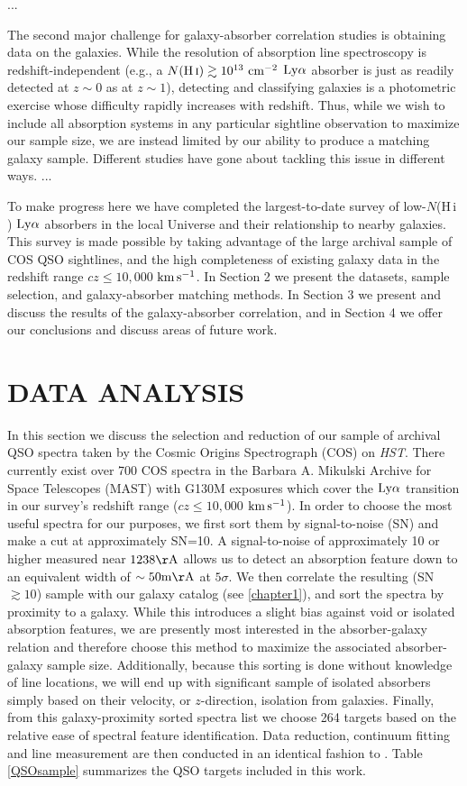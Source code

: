 \documentclass[twocolumn,tighten]{aastex62}
\newcommand{\kms}{$\rm km\, s^{-1}$}
\newcommand{\HI}{\mbox{H\,{\sc i}} }
\begin{document}
...


The second major challenge for galaxy-absorber correlation studies is obtaining data on the galaxies. While the resolution of absorption line spectroscopy is redshift-independent (e.g., a $N(\HI) \gtrsim 10^{13}  ~\rm cm^{-2}$ $\rm Ly\alpha$ absorber is just as readily detected at $z\sim0$ as at $z\sim 1$), detecting and classifying galaxies is a photometric exercise whose difficulty rapidly increases with redshift. Thus, while we wish to include all absorption systems in any particular sightline observation to maximize our sample size, we are instead limited by our ability to produce a matching galaxy sample. Different studies have gone about tackling this issue in different ways. ...


To make progress here we have completed the largest-to-date survey of low-$N$(\HI) $\rm Ly\alpha$ absorbers in the local Universe and their relationship to nearby galaxies. This survey is made possible by taking advantage of the large archival sample of COS QSO sightlines, and the high completeness of existing galaxy data in the redshift range $cz \leq 10,000$ \kms. In Section 2 we present the datasets, sample selection, and galaxy-absorber matching methods. In Section 3 we present and discuss the results of the galaxy-absorber correlation, and in Section 4 we offer our conclusions and discuss areas of future work.



\section{DATA ANALYSIS}
In this section we discuss the selection and reduction of our sample of archival QSO spectra taken by the Cosmic Origins Spectrograph (COS) on \textit{HST}. There currently exist over 700 COS spectra in the Barbara A. Mikulski Archive for Space Telescopes (MAST) with G130M exposures which cover the $\rm Ly\alpha$ transition in our survey's redshift range ($cz \leq 10,000$ \kms). In order to choose the most useful spectra for our purposes, we first sort them by signal-to-noise (SN) and make a cut at approximately SN=10. A signal-to-noise of approximately 10 or higher measured near $\rm 1238 \AA$ allows us to detect an absorption feature down to an equivalent width of $\rm \sim 50 m\AA$ at $5\sigma$. We then correlate the resulting (SN$\gtrsim 10$) sample with our galaxy catalog (see \ref{chapter1}), and sort the spectra by proximity to a galaxy. While this introduces a slight bias against void or isolated absorption features, we are presently most interested in the absorber-galaxy relation and therefore choose this method to maximize the associated absorber-galaxy sample size. Additionally, because this sorting is done without knowledge of line locations, we will end up with significant sample of isolated absorbers simply based on their velocity, or $z$-direction, isolation from galaxies. Finally, from this galaxy-proximity sorted spectra list we choose 264 targets based on the relative ease of spectral feature identification. Data reduction, continuum fitting and line measurement are then conducted in an identical fashion to \cite{french2017}. Table \ref{QSOsample} summarizes the QSO targets included in this work.
\end{document}
